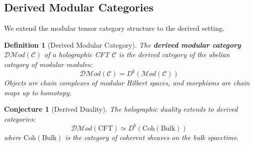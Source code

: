 \documentclass[12pt,a4paper]{article}
\newtheorem{conjecture}[theorem]{Conjecture}
\newtheorem{definition}[theorem]{Definition}
\begin{document}
\subsection{Derived Modular Categories}

We extend the modular tensor category structure to the derived setting.

\begin{definition}[Derived Modular Category]
The \textbf{derived modular category} $\mathcal{D}\mathcal{M}od(\mathcal{C})$ of a holographic CFT $\mathcal{C}$ is the derived category of the abelian category of modular modules:
\begin{equation}
\mathcal{D}\mathcal{M}od(\mathcal{C}) = D^b(\mathcal{M}od(\mathcal{C}))
\end{equation}
Objects are chain complexes of modular Hilbert spaces, and morphisms are chain maps up to homotopy.
\end{definition}

\begin{conjecture}[Derived Duality]
The holographic duality extends to derived categories:
\begin{equation}
\mathcal{D}\mathcal{M}od(\text{CFT}) \simeq D^b(\text{Coh}(\text{Bulk}))
\end{equation}
where $\text{Coh}(\text{Bulk})$ is the category of coherent sheaves on the bulk spacetime.
\end{conjecture}
\end{document}
